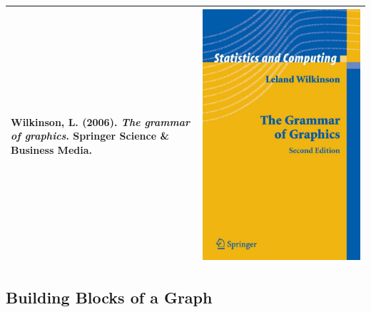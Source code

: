 \documentclass[]{article}
\theoremstyle{definition}
\theoremstyle{definition}
\theoremstyle{definition}
\theoremstyle{remark}
\begin{document}
\begin{longtable}[c]{@{}ll@{}}
\toprule
\begin{minipage}[t]{0.59\columnwidth}\raggedright\strut
Wilkinson, L. (2006). \emph{The grammar of graphics}. Springer Science
\& Business Media.
\strut\end{minipage} &
\begin{minipage}[t]{0.21\columnwidth}\raggedright\strut
\includegraphics{./img/grammer_of_graphics.png}
\strut\end{minipage}\tabularnewline
\bottomrule
\end{longtable}

\subsection{Building Blocks of a
Graph}\label{building-blocks-of-a-graph}
\end{document}
